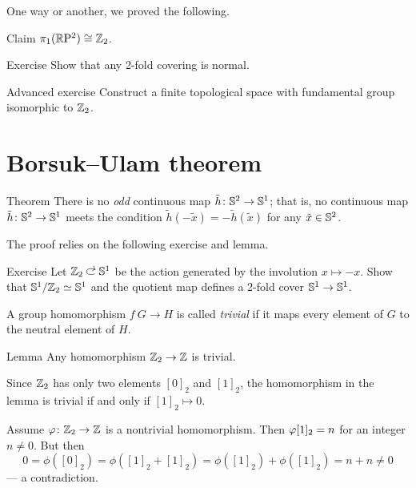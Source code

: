 {One way or another, we proved the following.

\begin{thm}{Claim}
$\pi_1(\mathbb{R}\mathrm{P}^2)\cong \mathbb{Z}_2$.
\end{thm}

\begin{thm}{Exercise}\label{ex:2-folded}
Show that any 2-fold covering is normal.

\end{thm}

\begin{thm}{Advanced exercise}\label{ex:finiteZ2}
Construct a finite topological space with fundamental group isomorphic to $\mathbb{Z}_2$.
\end{thm}

\section{Borsuk--Ulam theorem}

\begin{thm}{Theorem}\label{thm:Borsuk-Ulam}
There is no \emph{odd} continuous map $\tilde h\colon\mathbb{S}^2\to \mathbb{S}^1$;
that is, no continuous map $\tilde h\colon\mathbb{S}^2\to \mathbb{S}^1$ meets the condition $\tilde h(-\tilde x)=-\tilde h(\tilde x)$ for any $\tilde x\in\mathbb{S}^2$.
\end{thm}

The proof relies on the following exercise and lemma.

\begin{thm}[!]{Exercise}\label{ex:2-folded-s1}
Let $\ZZ_2\acts \SS^1$ be the action generated by the involution $x\mapsto -x$.
Show that $\mathbb{S}^1/\mathbb{Z}_2\simeq\mathbb{S}^1$ and the quotient map defines a 2-fold cover $\mathbb{S}^1\to \mathbb{S}^1$.
\end{thm}

A group homomorphism $f\:G\to H$ is called \emph{trivial} if it maps every element of $G$ to the neutral element of $H$.

\begin{thm}{Lemma}
Any homomorphism $\mathbb{Z}_2\to\mathbb{Z}$ is trivial.
\end{thm}

Since $\mathbb{Z}_2$ has only two elements $[0]_2$ and $[1]_2$,
the homomorphism in the lemma is trivial if and only if $[1]_2\mapsto 0$.

Assume $\varphi\colon\mathbb{Z}_2\to\mathbb{Z}$ is a nontrivial homomorphism.
Then $\phi[1]_2\z=n$ for an integer $n\ne 0$.
But then
\[
0=\phi([0]_2)=\phi([1]_2+[1]_2)=\phi([1]_2)+\phi([1]_2) =n+n\ne 0
\]
--- a contradiction.
\qeds


}
